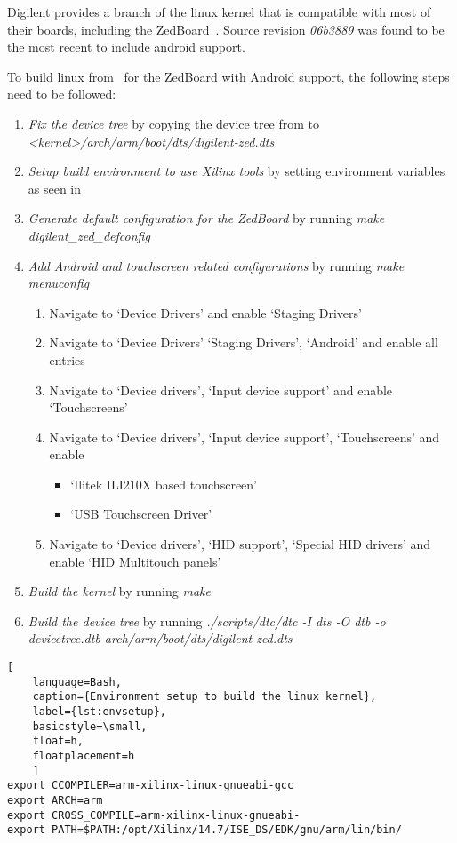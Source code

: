 Digilent provides a branch of the linux kernel that is compatible with most of
their boards, including the ZedBoard~\cite{DigilentLinux}.
Source revision \emph{06b3889} was found to be the most recent to include
android support.

To build linux from~\cite{DigilentLinux} for the ZedBoard with Android support,
the following steps need to be followed:
\begin{enumerate}
	\item \emph{Fix the device tree} by copying the device tree from
		\cite{DigilentReferenceDesign} to
		\emph{<kernel>/arch/arm/boot/dts/digilent-zed.dts}
	\item \emph{Setup build environment to use Xilinx tools} by setting
		environment variables as seen in 
	\item \emph{Generate default configuration for the ZedBoard} by running
		\emph{make digilent\_zed\_defconfig}
	\item \emph{Add Android and touchscreen related configurations} by running
		\emph{make menuconfig}
		\begin{enumerate}
			\item Navigate to `Device Drivers' and enable `Staging Drivers'
			\item Navigate to `Device Drivers' `Staging Drivers', `Android'
				and enable all entries
			\item Navigate to `Device drivers', `Input device support' and
				enable `Touchscreens'
			\item Navigate to `Device drivers', `Input device support',
				`Touchscreens' and enable
				\begin{itemize}
					\item `Ilitek ILI210X based touchscreen'
					\item `USB Touchscreen Driver'
				\end{itemize}
			\item Navigate to `Device drivers', `HID support', `Special HID
				drivers' and enable `HID Multitouch panels'
		\end{enumerate}
	\item \emph{Build the kernel} by running \emph{make}
	\item \emph{Build the device tree} by running \emph{./scripts/dtc/dtc -I dts
		-O dtb -o devicetree.dtb arch/arm/boot/dts/digilent-zed.dts}
\end{enumerate}
\begin{lstlisting}[
	language=Bash,
	caption={Environment setup to build the linux kernel},
	label={lst:envsetup},
	basicstyle=\small,
	float=h,
	floatplacement=h
	]
export CCOMPILER=arm-xilinx-linux-gnueabi-gcc
export ARCH=arm
export CROSS_COMPILE=arm-xilinx-linux-gnueabi-
export PATH=$PATH:/opt/Xilinx/14.7/ISE_DS/EDK/gnu/arm/lin/bin/		
\end{lstlisting}
